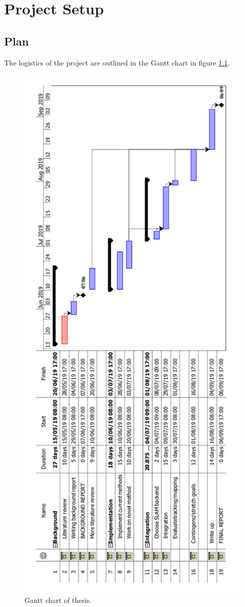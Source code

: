 \documentclass[12pt,twoside]{report}
\begin{document}
\chapter{Project Setup}

\section{Plan}

The logistics of the project are outlined in the Gantt chart in figure \ref{fig:gantt}.
\\

\begin{figure}[hbtp]%
\centering
\includegraphics[width = 0.65\hsize]{./figures/gantt}
\caption{Gantt chart of thesis.}
\label{fig:gantt}
\end{figure}
\end{document}
